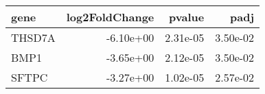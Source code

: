 \begin{tabular}{lrrr}
\toprule
  gene &  log2FoldChange &   pvalue &     padj \\
\midrule
THSD7A &       -6.10e+00 & 2.31e-05 & 3.50e-02 \\
  BMP1 &       -3.65e+00 & 2.12e-05 & 3.50e-02 \\
 SFTPC &       -3.27e+00 & 1.02e-05 & 2.57e-02 \\
\bottomrule
\end{tabular}
